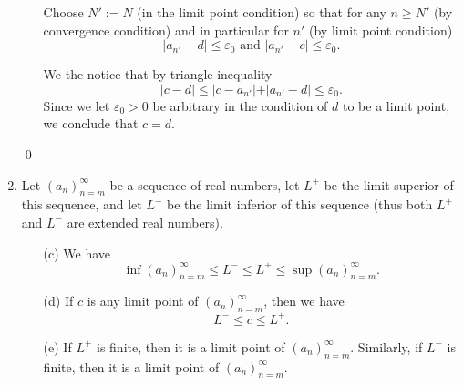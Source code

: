 \documentclass{article}
\theoremstyle{remark}
\begin{document}
\begin{enumerate}
\begin{enumerate}
            Choose $N' := N$ (in the limit point condition) so that for any $n \geq N'$ (by convergence condition) and in particular for $n'$ (by limit point condition)
            \[
            \vert a_{n'} - d \vert \leq \varepsilon_0 \text{ and } \vert a_{n'} - c \vert \leq \varepsilon_0.
            \]

            We the notice that by triangle inequality
            \[
            \vert c - d \vert \leq \vert c - a_{n'}\vert + \vert a_{n'} - d\vert \leq \varepsilon_0.
            \]
            Since we let $\varepsilon_0 > 0$ be arbitrary in the condition of $d$ to be a limit point, we conclude that $c = d$.
        \end{enumerate}
        \begin{flushright}
            \qed
        \end{flushright}

        \item Let \( (a_n)_{n=m}^{\infty} \) be a sequence
        of real numbers, let \( L^+ \) be the limit superior of this sequence,
        and let \( L^- \) be the limit inferior of this sequence
        (thus both \( L^+ \) and \( L^- \) are extended real numbers).
        \begin{enumerate}
            \item[(c)] We have 
            \[
                \inf(a_n)_{n=m}^{\infty} \leq L^- \leq L^+ \leq \sup(a_n)_{n=m}^{\infty}.
            \]
        
            \item[(d)] If \( c \) is any limit point of \( (a_n)_{n=m}^{\infty} \),
            then we have 
            \[
                L^- \leq c \leq L^+.
            \]
        
            \item[(e)] If \( L^+ \) is finite, then it is a limit point of 
            \( (a_n)_{n=m}^{\infty} \). Similarly, if \( L^- \) is finite,
            then it is a limit point of \( (a_n)_{n=m}^{\infty} \).
        

\end{enumerate}
\end{enumerate}
\end{document}

